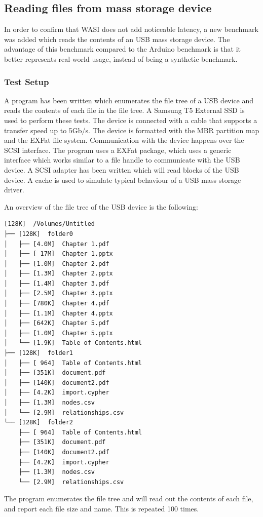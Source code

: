 \subsection{Reading files from mass storage device}

In order to confirm that WASI does not add noticeable latency, a new benchmark was added which reads the contents of an USB mass storage device. The advantage of this benchmark compared to the Arduino benchmark is that it better represents real-world usage, instead of being a synthetic benchmark.

\subsubsection{Test Setup}
A program has been written which enumerates the file tree of a USB device and reads the contents of each file in the file tree. A Samsung T5 External SSD is used to perform these tests. The device is connected with a cable that supports a transfer speed up to 5Gb/s. The device is formatted with the MBR partition map and the EXFat file system. Communication with the device happens over the SCSI interface. The program uses a EXFat package, which uses a generic interface which works similar to a file handle to communicate with the USB device. A SCSI adapter has been written which will read blocks of the USB device. A cache is used to simulate typical behaviour of a USB mass storage driver.

An overview of the file tree of the USB device is the following:

\begin{verbatim}
[128K]  /Volumes/Untitled
├── [128K]  folder0
│   ├── [4.0M]  Chapter 1.pdf
│   ├── [ 17M]  Chapter 1.pptx
│   ├── [1.0M]  Chapter 2.pdf
│   ├── [1.3M]  Chapter 2.pptx
│   ├── [1.4M]  Chapter 3.pdf
│   ├── [2.5M]  Chapter 3.pptx
│   ├── [780K]  Chapter 4.pdf
│   ├── [1.1M]  Chapter 4.pptx
│   ├── [642K]  Chapter 5.pdf
│   ├── [1.0M]  Chapter 5.pptx
│   └── [1.9K]  Table of Contents.html
├── [128K]  folder1
│   ├── [ 964]  Table of Contents.html
│   ├── [351K]  document.pdf
│   ├── [140K]  document2.pdf
│   ├── [4.2K]  import.cypher
│   ├── [1.3M]  nodes.csv
│   └── [2.9M]  relationships.csv
└── [128K]  folder2
    ├── [ 964]  Table of Contents.html
    ├── [351K]  document.pdf
    ├── [140K]  document2.pdf
    ├── [4.2K]  import.cypher
    ├── [1.3M]  nodes.csv
    └── [2.9M]  relationships.csv
\end{verbatim}

The program enumerates the file tree and will read out the contents of each file, and report each file size and name. This is repeated 100 times.

